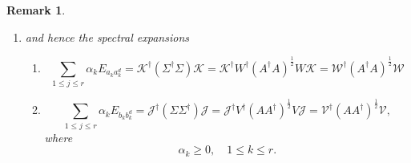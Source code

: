 \documentclass[aps,preprint]{revtex4}%
\newtheorem{remark}[theorem]{Remark}
\begin{document}
\begin{remark}
\begin{enumerate}
\begin{enumerate}
\item
\begin{align}
V\left(  A\right)   &  =V\\
W\left(  A\right)   &  =W\\
\Sigma\left(  A\right)   &  =\left(  A^{\dagger}A\right)  ^{\frac{1}{2}%
}=\Sigma=\sum_{1\leq j\leq r}\alpha_{j}P\left(  \Sigma\right)  _{j}%
=\sum_{1\leq j\leq r}\alpha_{j}P\left(  \left(  A^{\dagger}A\right)
^{\frac{1}{2}}\right)  _{j}=\sum_{1\leq j\leq r}\alpha_{j}P\left(  A^{\dagger
}A\right)  _{j}%
\end{align}
one obtains

\item
\begin{align}
A^{\dagger}A  &  =W\Sigma^{\dagger}V^{\dagger}V\Sigma W^{\dagger}%
=W\Sigma^{\dagger}\Sigma W^{\dagger}=W\sum_{1\leq j\leq r}\alpha_{j}%
^{2}P\left(  A^{\dagger}A\right)  _{j}W^{\dagger}=\sum_{1\leq j\leq r}%
\alpha_{j}^{2}WP\left(  A^{\dagger}A\right)  _{j}W^{\dagger}\\
AA^{\dagger}  &  =V\Sigma W^{\dagger}W\Sigma^{\dagger}V^{\dagger}%
=V\Sigma\Sigma^{\dagger}V^{\dagger}=V\sum_{1\leq j\leq r}\alpha_{j}%
^{2}P\left(  AA^{\dagger}\right)  _{j}V^{\dagger}=\sum_{1\leq j\leq r}%
\alpha_{j}^{2}VP\left(  AA^{\dagger}\right)  _{j}V^{\dagger}%
\end{align}
giving%
\begin{align}
\Sigma^{\dagger}\Sigma &  =W^{\dagger}\left(  A^{\dagger}A\right)  ^{\frac
{1}{2}}W\\
\Sigma\Sigma^{\dagger}  &  =V^{\dagger}\left(  AA^{\dagger}\right)  ^{\frac
{1}{2}}V.
\end{align}

\end{enumerate}

\item and hence the spectral expansions

\begin{enumerate}
\item
\begin{equation}
\sum_{1\leq j\leq r}\alpha_{k}E_{a_{k}a_{k}^{d}}=\mathcal{K}^{\dagger}\left(
\Sigma^{\dagger}\Sigma\right)  \mathcal{K}=\mathcal{K}^{\dagger}W^{\dagger
}\left(  A^{\dagger}A\right)  ^{\frac{1}{2}}W\mathcal{K}=\mathcal{W}^{\dagger
}\left(  A^{\dagger}A\right)  ^{\frac{1}{2}}\mathcal{W}%
\end{equation}


\item
\begin{equation}
\sum_{1\leq j\leq r}\alpha_{k}E_{b_{k}b_{k}^{d}}=\mathcal{J}^{\dagger}\left(
\Sigma\Sigma^{\dagger}\right)  \mathcal{J}=\mathcal{J}^{\dagger}V^{\dagger
}\left(  AA^{\dagger}\right)  ^{\frac{1}{2}}V\mathcal{J}=\mathcal{V}^{\dagger
}\left(  AA^{\dagger}\right)  ^{\frac{1}{2}}\mathcal{V},
\end{equation}
where
\begin{equation}
\alpha_{k}\geq0,\quad1\leq k\leq r.
\end{equation}


\end{enumerate}
\end{enumerate}
\end{remark}
\end{document}
